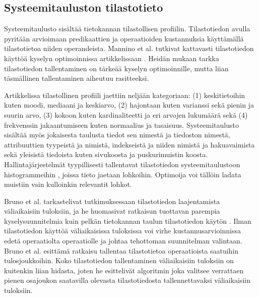 \documentclass[finnish]{tktltiki2}
\theoremstyle{definition}
\theoremstyle{remark}
\begin{document}

\subsection{Systeemitauluston tilastotieto}
Systeemitaulusto sisältää tietokannan tilastollisen profiilin. Tilastotiedon avulla pyritään arvioimaan predikaattien ja operaatioiden kustannuksia käyttämällä tilastotietoa niiden operandeista. Mannino et al. tutkivat kattavasti tilastotiedon käyttöä kyselyn optimoinnissa artikkelissaan \cite{mannino1988statistical}. Heidän mukaan tarkka tilastotiedon tallentaminen on tärkeää kyselyn optimoinnille, mutta liian täsmällinen tallentaminen aiheutuu rasitteeksi.

Artikkelissa tilastollinen profiili jaettiin neljään kategoriaan: (1) keskitietoihin kuten moodi, mediaani ja keskiarvo,  (2) hajontaan kuten varianssi sekä pienin ja suurin arvo, (3) kokoon kuten kardinaliteetti ja eri arvojen lukumäärä sekä (4) frekvenssin jakaantumiseen kuten normaalius ja tasaisuus. Systeemitaulusto sisältää myös jokaisesta taulusta tiedot sen nimestä ja tiedoston nimestä,  attribuuttien tyypeistä ja nimistä, indekseistä ja niiden nimistä ja hakuavaimista sekä yleisistä tiedoista kuten sivukoosta ja puskurimuistin koosta. Hallintajärjestelmät tyypillisesti tallentavat tilastotiedon systeemitaulustoon histogrammeihin \cite{chaudhuri1998}, joissa tieto jaetaan lohkoihin. Optimoija voi tällöin ladata muistiin vain kulloinkin relevantit lohkot. %

Bruno et al. tarkastelivat tutkimuksessaan tilastotiedon laajentamista väliaikaisiin tuloksiin, ja he huomasivat ratkaisun tuottavan parempia kyselysuunnitelmia kuin pelkän tietokannan taulun tilastotiedon käytön \cite{bruno2002exploiting}. Ilman tilastotiedon käyttöä väliaikaisissa tuloksissa voi virhe kustannusarvioinnissa edetä operaatiolta operaatiolle ja johtaa tehottoman suunnitelman valintaan. Bruno et al. esittämä ratkaisu tallentaa tilastotietoa operaatioista saatuihin tulosjoukkoihin. Koko tilastotiedon tallentaminen väliaikaisiin tuloksiin on kuitenkin liian hidasta, joten he esittelivät algoritmin joka valitsee verrattaen pienen osajoukon saatavilla olevasta tilastotiedosta tallennettavaksi väliaikaisiin tuloksiin.
\end{document}
